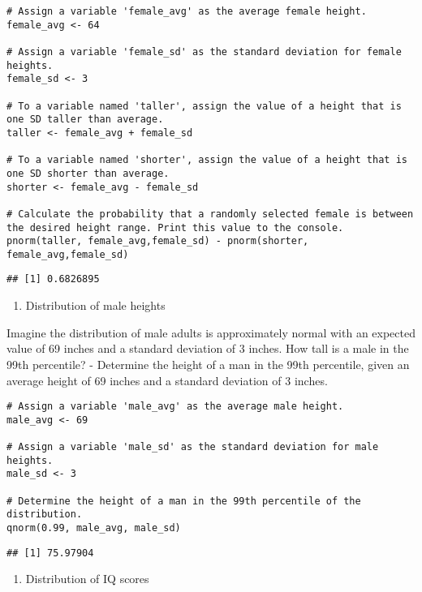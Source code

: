 \documentclass[
]{article}
\providecommand{\tightlist}{%
  \setlength{\itemsep}{0pt}\setlength{\parskip}{0pt}}
\begin{document}
\begin{verbatim}
# Assign a variable 'female_avg' as the average female height.
female_avg <- 64

# Assign a variable 'female_sd' as the standard deviation for female heights.
female_sd <- 3

# To a variable named 'taller', assign the value of a height that is one SD taller than average.
taller <- female_avg + female_sd

# To a variable named 'shorter', assign the value of a height that is one SD shorter than average.
shorter <- female_avg - female_sd

# Calculate the probability that a randomly selected female is between the desired height range. Print this value to the console.
pnorm(taller, female_avg,female_sd) - pnorm(shorter, female_avg,female_sd)
\end{verbatim}

\begin{verbatim}
## [1] 0.6826895
\end{verbatim}

\begin{enumerate}
\def\labelenumi{\arabic{enumi}.}
\setcounter{enumi}{5}
\tightlist
\item
  Distribution of male heights
\end{enumerate}

Imagine the distribution of male adults is approximately normal with an
expected value of 69 inches and a standard deviation of 3 inches. How
tall is a male in the 99th percentile? - Determine the height of a man
in the 99th percentile, given an average height of 69 inches and a
standard deviation of 3 inches.

\begin{verbatim}
# Assign a variable 'male_avg' as the average male height.
male_avg <- 69

# Assign a variable 'male_sd' as the standard deviation for male heights.
male_sd <- 3

# Determine the height of a man in the 99th percentile of the distribution.
qnorm(0.99, male_avg, male_sd)
\end{verbatim}

\begin{verbatim}
## [1] 75.97904
\end{verbatim}

\begin{enumerate}
\def\labelenumi{\arabic{enumi}.}
\setcounter{enumi}{6}
\tightlist
\item
  Distribution of IQ scores
\end{enumerate}
\end{document}
